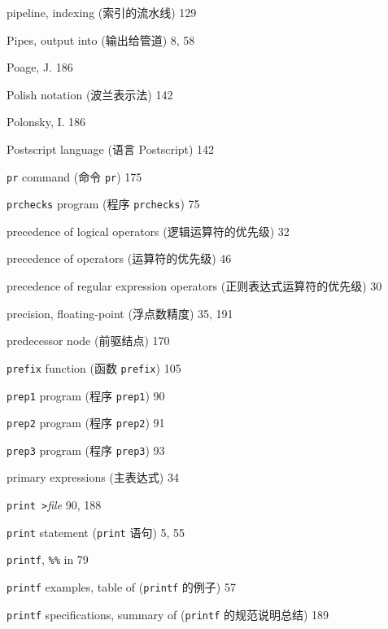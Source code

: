 \begin{multicols}{3}
\hangindent=3pc  pipeline, indexing (索引的流水线) 129

\hangindent=3pc  Pipes, output into (输出给管道) 8, 58

\hangindent=3pc  Poage, J. 186

\hangindent=3pc  Polish notation (波兰表示法) 142

\hangindent=3pc  Polonsky, I. 186

\hangindent=3pc  Postscript language (语言 Postscript) 142

\hangindent=3pc  \verb'pr' command (命令 \verb'pr') 175

\hangindent=3pc  \verb'prchecks' program (程序 \verb'prchecks') 75

\hangindent=3pc  precedence of logical operators
(逻辑运算符的优先级) 32

\hangindent=3pc  precedence of operators (运算符的优先级) 46

\hangindent=3pc  precedence of regular expression operators
(正则表达式运算符的优先级) 30

\hangindent=3pc  precision, floating-point (浮点数精度) 35, 191

\hangindent=3pc  predecessor node (前驱结点) 170

\hangindent=3pc  \verb'prefix' function (函数 \verb'prefix') 105

\hangindent=3pc  \verb'prep1' program (程序 \verb'prep1') 90

\hangindent=3pc  \verb'prep2' program (程序 \verb'prep2') 91

\hangindent=3pc  \verb'prep3' program (程序 \verb'prep3') 93

\hangindent=3pc  primary expressions (主表达式) 34

\hangindent=3pc  \verb'print >'\textit{file} 90, 188

\hangindent=3pc  \verb'print' statement (\verb'print' 语句) 5, 55

\hangindent=3pc  \verb'printf', \verb'%%' in 79

\hangindent=3pc  \verb'printf' examples, table of
(\verb'printf' 的例子) 57

\hangindent=3pc  \verb'printf' specifications, summary of
(\verb'printf' 的规范说明总结) 189



\end{multicols}
